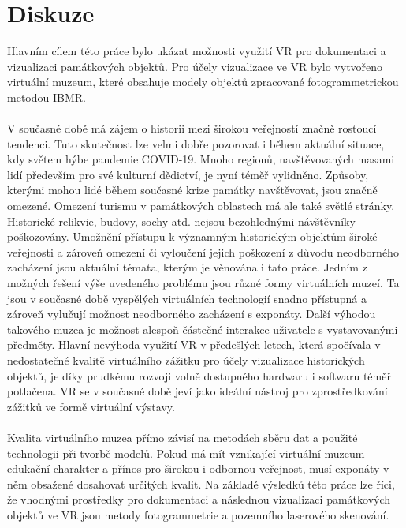 \documentclass[a4paper, 12pt]{report}
\begin{document}
\chapter{Diskuze}
Hlavním cílem této práce bylo ukázat možnosti využití VR pro dokumentaci a vizualizaci památkových objektů. Pro účely vizualizace ve VR bylo vytvořeno virtuální muzeum, které obsahuje modely objektů zpracované fotogrammetrickou metodou IBMR.\\
\\
V současné době má zájem o historii mezi širokou veřejností značně rostoucí tendenci. Tuto skutečnost lze velmi dobře pozorovat i během aktuální situace, kdy světem hýbe pandemie COVID-19. Mnoho regionů, navštěvovaných masami lidí především pro své kulturní dědictví, je nyní téměř vylidněno. Způsoby, kterými mohou lidé během současné krize památky navštěvovat, jsou značně omezené. Omezení turismu v památkových oblastech má ale také světlé stránky. Historické relikvie, budovy, sochy atd. nejsou bezohlednými návštěvníky poškozovány. Umožnění přístupu k významným historickým objektům široké veřejnosti a zároveň omezení či vyloučení jejich poškození z důvodu neodborného zacházení jsou aktuální témata, kterým je věnována i tato práce. Jedním z možných řešení výše uvedeného problému jsou různé formy virtuálních muzeí. Ta jsou v současné době vyspělých virtuálních technologií snadno přístupná a zároveň vylučují možnost neodborného zacházení s exponáty. Další výhodou takového muzea je možnost alespoň částečné interakce uživatele s vystavovanými předměty. Hlavní nevýhoda využití VR v předešlých letech, která spočívala v nedostatečné kvalitě virtuálního zážitku pro účely vizualizace historických objektů, je díky prudkému rozvoji volně dostupného hardwaru i softwaru téměř potlačena. VR se v současné době jeví jako ideální nástroj pro zprostředkování zážitků ve formě virtuální výstavy.\\
\\
Kvalita virtuálního muzea přímo závisí na metodách sběru dat a použité technologii při tvorbě modelů. Pokud má mít vznikající virtuální muzeum edukační charakter a přínos pro širokou i odbornou veřejnost, musí exponáty v něm obsažené dosahovat určitých kvalit. Na základě výsledků této práce lze říci, že vhodnými prostředky pro dokumentaci a následnou vizualizaci památkových objektů ve VR jsou metody fotogrammetrie a pozemního laserového skenování.\\
\\
\end{document}
